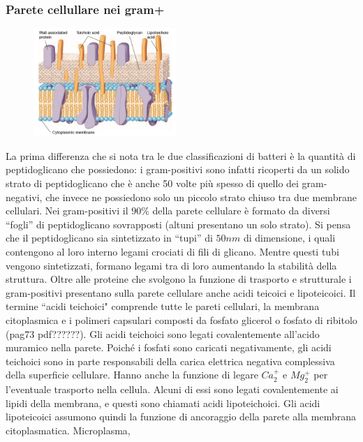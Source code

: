 \subsubsection{Parete cellullare nei gram+} 
\begin{figure}
  \begin{center}
    \includegraphics[width=0.48\textwidth]{Pictures/4.png}
  \end{center}
\end{figure}
La prima differenza che si nota tra le due classificazioni di batteri è la quantità di peptidoglicano che possiedono: i gram-positivi sono infatti ricoperti da un 
solido strato di peptidoglicano che è anche 50 volte più spesso di quello dei gram-negativi, che invece ne possiedono solo un piccolo strato chiuso tra due membrane cellulari.
Nei gram-positivi il $90\%$ della parete cellulare \`e formato da diversi ``fogli” di peptidoglicano sovrapposti (altuni presentano un solo strato). 
Si pensa che il peptidoglicano sia sintetizzato in ``tupi” di $50nm$ di dimensione, i quali contengono al 
loro interno legami crociati di fili di glicano. Mentre questi tubi vengono sintetizzati, formano legami tra di loro aumentando la stabilit\`a della struttura. 
Oltre alle proteine che svolgono la funzione di trasporto e strutturale i gram-positivi presentano sulla parete cellulare anche acidi teicoici e lipoteicoici. Il 
termine ``acidi teichoici" comprende tutte le pareti cellulari, la membrana citoplasmica e i polimeri capsulari composti da fosfato glicerol o fosfato di 
ribitolo (pag73 pdf??????). Gli acidi teichoici sono legati covalentemente all’acido muramico nella parete. Poiché i fosfati sono caricati negativamente, gli acidi 
teichoici sono in parte responsabili della carica elettrica negativa complessiva della superficie cellulare. Hanno anche la funzione di legare 
$Ca_2^+$ e $Mg_2^+$ per l'eventuale trasporto nella cellula. Alcuni di essi sono legati covalentemente ai lipidi della membrana, e questi sono chiamati 
acidi lipoteichoici. Gli acidi lipoteicoici assumono quindi la funzione di ancoraggio della parete alla membrana citoplasmatica. Microplasma, 
